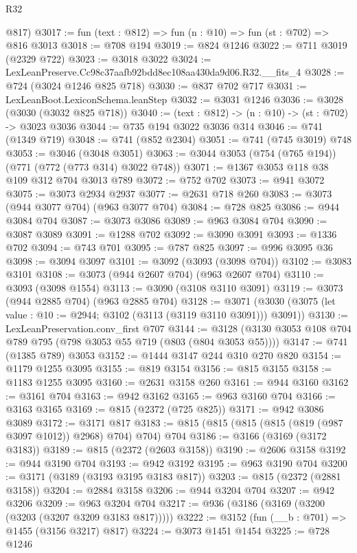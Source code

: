 \begin{lexlean}{R32}
\begin{coremodule}
      @817)
@3017 := fun (text : @812) => fun (n : @10) => fun (st : @702) => @816 @3013
@3018 := @708 @194
@3019 := @824 @1246
@3022 := @711 @3019 (@2329 @722)
@3023 := @3018 @3022
@3024 := LexLeanPreserve.Cc98c37aafb92bdd8ec108aa430da9d06.R32.__fits_4
@3028 := @724 (@3024 @1246 @825 @718)
@3030 := @837 @702 @717
@3031 := LexLeanBoot.LexiconSchema.leanStep
@3032 := @3031 @1246
@3036 := @3028 (@3030 (@3032 @825 @718))
@3040 := (text : @812) -> (n : @10) -> (st : @702) -> @3023 @3036
@3044 := @735 @194 @3022 @3036 @314
@3046 := @741 (@1349 @719)
@3048 := @741 (@852 @2304)
@3051 := @741 (@745 @3019) @748
@3053 := @3046 (@3048 @3051)
@3063 := @3044 @3053 (@754 (@765 @194)) (@771 (@772 (@773 @314) @3022 @748))
@3071 := @1367 @3053 @118 @38 @109 @312 @704 @3013 @789
@3072 := @752 @702
@3073 := @941 @3072
@3075 := @3073 @2934 @2937
@3077 := @2631 @718 @260
@3083 := @3073 (@944 @3077 @704) (@963 @3077 @704)
@3084 := @728 @825
@3086 := @944 @3084 @704
@3087 := @3073 @3086
@3089 := @963 @3084 @704
@3090 := @3087 @3089
@3091 := @1288 @702
@3092 := @3090 @3091
@3093 := @1336 @702
@3094 := @743 @701
@3095 := @787 @825
@3097 := @996 @3095 @36
@3098 := @3094 @3097
@3101 := @3092 (@3093 (@3098 @704))
@3102 := @3083 @3101
@3108 := @3073 (@944 @2607 @704) (@963 @2607 @704)
@3110 := @3093 (@3098 @1554)
@3113 := @3090 (@3108 @3110 @3091)
@3119 := @3073 (@944 @2885 @704) (@963 @2885 @704)
@3128 := @3071 (@3030 (@3075 (let value : @10 := @2944; @3102 (@3113 (@3119 @3110 @3091))) @3091))
@3130 := LexLeanPreservation.conv_first @707
@3144 := @3128 (@3130 @3053 @108 @704 @789 @795 (@798 @3053 @55 @719 (@803 (@804 @3053 @55))))
@3147 := @741 (@1385 @789) @3053
@3152 := @1444 @3147 @244 @310 @270 @820
@3154 := @1179 @1255 @3095
@3155 := @819 @3154
@3156 := @815 @3155
@3158 := @1183 @1255 @3095
@3160 := @2631 @3158 @260
@3161 := @944 @3160
@3162 := @3161 @704
@3163 := @942 @3162
@3165 := @963 @3160 @704
@3166 := @3163 @3165
@3169 := @815 (@2372 (@725 @825))
@3171 := @942 @3086 @3089
@3172 := @3171 @817
@3183 := @815 (@815 (@815 (@815 (@819 (@987 @3097 @1012)) @2968) @704) @704) @704
@3186 := @3166 (@3169 (@3172 @3183))
@3189 := @815 (@2372 (@2603 @3158))
@3190 := @2606 @3158
@3192 := @944 @3190 @704
@3193 := @942 @3192
@3195 := @963 @3190 @704
@3200 := @3171 (@3189 (@3193 @3195 @3183 @817))
@3203 := @815 (@2372 (@2881 @3158))
@3204 := @2884 @3158
@3206 := @944 @3204 @704
@3207 := @942 @3206
@3209 := @963 @3204 @704
@3217 := @936 (@3186 (@3169 (@3200 (@3203 (@3207 @3209 @3183 @817)))))
@3222 := @3152 (fun (__b : @701) => @1455 (@3156 @3217) @817)
@3224 := @3073 @1451 @1454
@3225 := @728 @1246

\end{coremodule}
\end{lexlean}
